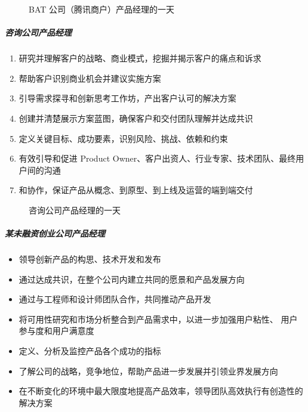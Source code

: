 \documentclass[letterpaper,11pt,english]{sphinxmanual}
\begin{document}
\begin{figure}[H]
\centering
\capstart

\noindent{}
\caption{BAT 公司（腾讯商户）产品经理的一天}\label{\detokenize{chapter_experience/1Day:id9}}\end{figure}


\subparagraph{咨询公司产品经理}
\label{\detokenize{chapter_experience/1Day:id6}}\begin{enumerate}
%
\item {} 
研究并理解客户的战略、商业模式，挖掘并揭示客户的痛点和诉求

\item {} 
帮助客户识别商业机会并建议实施方案

\item {} 
引导需求探寻和创新思考工作坊，产出客户认可的解决方案

\item {} 
创建并清楚展示方案蓝图，确保客户和交付团队理解并达成共识

\item {} 
定义关键目标、成功要素，识别风险、挑战、依赖和约束

\item {} 
有效引导和促进 Product
Owner、客户出资人、行业专家、技术团队、最终用户间的沟通

\item {} 
和协作，保证产品从概念、到原型、到上线及运营的端到端交付

\end{enumerate}

\begin{figure}[H]
\centering
\capstart

\noindent{}
\caption{咨询公司产品经理的一天}\label{\detokenize{chapter_experience/1Day:id10}}\end{figure}


\subparagraph{某未融资创业公司产品经理}
\label{\detokenize{chapter_experience/1Day:id7}}\begin{itemize}
\item {} 
领导创新产品的构思、技术开发和发布

\item {} 
通过达成共识，在整个公司内建立共同的愿景和产品发展方向

\item {} 
通过与工程师和设计师团队合作，共同推动产品开发

\item {} 
将可用性研究和市场分析整合到产品需求中，以进一步加强用户粘性、
用户参与度和用户满意度

\item {} 
定义、分析及监控产品各个成功的指标

\item {} 
了解公司的战略，竞争地位，帮助产品进一步发展并引领业界发展方向

\item {} 
在不断变化的环境中最大限度地提高产品效率，领导团队高效执行有创造性的解决方案

\end{itemize}
\end{document}

